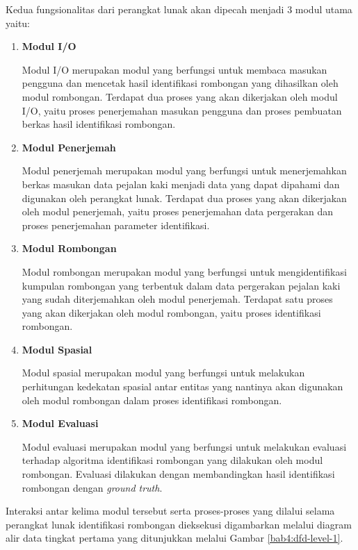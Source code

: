 \noindent Kedua fungsionalitas dari perangkat lunak akan dipecah menjadi 3 modul utama yaitu:

\begin{enumerate}
    \item \textbf{Modul I/O}
    
    Modul I/O merupakan modul yang berfungsi untuk membaca masukan pengguna dan mencetak hasil identifikasi rombongan yang dihasilkan oleh modul rombongan. Terdapat dua proses yang akan dikerjakan oleh modul I/O, yaitu proses penerjemahan masukan pengguna dan proses pembuatan berkas hasil identifikasi rombongan.
    
    \item \textbf{Modul Penerjemah}
    
    Modul penerjemah merupakan modul yang berfungsi untuk menerjemahkan berkas masukan data pejalan kaki menjadi data yang dapat dipahami dan digunakan oleh perangkat lunak. Terdapat dua proses yang akan dikerjakan oleh modul penerjemah, yaitu proses penerjemahan data pergerakan dan proses penerjemahan parameter identifikasi.
    
    \item \textbf{Modul Rombongan}
    
    Modul rombongan merupakan modul yang berfungsi untuk mengidentifikasi kumpulan rombongan yang terbentuk dalam data pergerakan pejalan kaki yang sudah diterjemahkan oleh modul penerjemah. Terdapat satu proses yang akan dikerjakan oleh modul rombongan, yaitu proses identifikasi rombongan.
    
    \item \textbf{Modul Spasial}
    
    Modul spasial merupakan modul yang berfungsi untuk melakukan perhitungan kedekatan spasial antar entitas yang nantinya akan digunakan oleh modul rombongan dalam proses identifikasi rombongan.
    
    \item \textbf{Modul Evaluasi}
    
    Modul evaluasi merupakan modul yang berfungsi untuk melakukan evaluasi terhadap algoritma identifikasi rombongan yang dilakukan oleh modul rombongan. Evaluasi dilakukan dengan membandingkan hasil identifikasi rombongan dengan \textit{ground truth}.
\end{enumerate}

Interaksi antar kelima modul tersebut serta proses-proses yang dilalui selama perangkat lunak identifikasi rombongan dieksekusi digambarkan melalui diagram alir data tingkat pertama yang ditunjukkan melalui Gambar \ref{bab4:dfd-level-1}.

